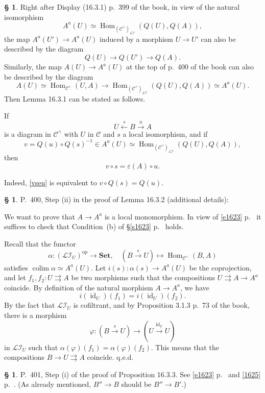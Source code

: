 \documentclass[12pt]{article}%
\theoremstyle{remark}
\theoremstyle{definition}
\newtheorem{s}[thm]{\S}%
\newcommand{\cc}{\mathcal}
\newcommand{\C}{\mathcal C}
\newcommand{\Set}{\mathbf{Set}}%
\newcommand{\ee}{\varepsilon}
\newcommand{\pp}{\varphi}
\newcommand{\parar}{\rightrightarrows}
\newcommand{\xr}{\xrightarrow}
\DeclareMathOperator*{\colim}{colim}%
\DeclareMathOperator{\id}{id}
\DeclareMathOperator{\Hom}{Hom}%
\DeclareMathOperator{\op}{op}
\begin{document}
%

\begin{s}
Right after Display (16.3.1) p.~399 of the book, in view of the natural isomorphism 
$$
A^a(U)\simeq\Hom_{({\C^\wedge})_{\cc{LI}}}(Q(U),Q(A)),
$$ 
the map $A^a(U')\to A^a(U)$ induced by a morphism $U\to U'$ can also be described by the diagram 
$$
Q(U)\to Q(U')\to Q(A).
$$ 
Similarly, the map $A(U)\to A^a(U)$ at the top of p.~400 of the book can also be described by the diagram 
$$
A(U)\simeq\Hom_{\C^\wedge}(U,A)\to\Hom_{({\C^\wedge})_{\cc{LI}}}(Q(U),Q(A))\simeq A^a(U).
$$ 
Then Lemma 16.3.1 can be stated as follows. 

If 
$$
U\xleftarrow sB\xr uA
$$ 
is a diagram in $\C^\wedge$ with $U$ in $\C$ and $s$ a local isomorphism, and if 
$$
v=Q(u)\circ Q(s)^{-1}\in A^a(U)\simeq\Hom_{({\C^\wedge})_{\cc{LI}}}(Q(U),Q(A)), 
$$ 
then 
\begin{equation}\label{vseu}
v\circ s=\ee(A)\circ u.
\end{equation}

Indeed, \eqref{vseu} is equivalent to $v\circ Q(s)=Q(u)$.
\end{s}

%

\begin{s} 
P.~400, Step (ii) in the proof of Lemma 16.3.2 (additional details):

We want to prove that $A\to A^a$ is a local monomorphism. In view of \eqref{e1623} p.~\pageref{e1623} it suffices to check that Condition~(b) of \S\ref{s1623} p.~\pageref{s1623} holds. 

Recall that the functor 
$$
\alpha:(\cc{LI}_U)^{\op}\to\Set,\quad(B\xr sU)\mapsto\Hom_{\C^\wedge}(B,A)
$$ 
satisfies $\colim\alpha\simeq A^a(U)$. Let $i(s):\alpha(s)\to A^a(U)$ be the coprojection, and let $f_1,f_2:U\parar A$ be two morphisms such that the compositions $U\parar A\to A^a$ coincide. By definition of the natural morphism $A\to A^a$, we have 
$$
i(\id_U)(f_1)=i(\id_U)(f_2).
$$ 
By the fact that $\cc{LI}_U$ is cofiltrant, and by Proposition 3.1.3 p.~73 of the book, there is a morphism 
$$
\pp:(B\xr sU)\to(U\xr{\id_U}U)
$$ 
in $\cc{LI}_U$ such that $\alpha(\pp)(f_1)=\alpha(\pp)(f_2)$. This means that the compositions $B\to U\parar A$ coincide. q.e.d.
\end{s}

%

\begin{s} P.~401, Step (i) of the proof of Proposition 16.3.3. See \eqref{e1623} p.~\pageref{e1623} and \eqref{1625} p.~\pageref{1625}. (As already mentioned, $B''\to B$ should be $B''\to B'$.)
\end{s}
\end{document}
